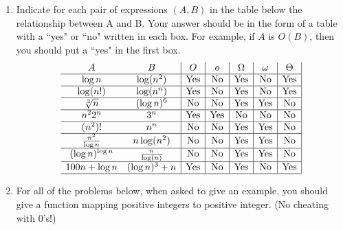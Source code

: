 \documentclass[12pt]{scrartcl}
\begin{document}
\begin{enumerate}
	\item Indicate for each pair of expressions $(A, B)$ in the table below the relationship between A and B. Your answer should be in the form of a table with a ``yes" or ``no" written in each box. For example, if $A$ is $O(B)$, then you should put a ``yes" in the first box.
$$
\begin{array}{cc|c|c|c|c|c|} 
		A 				& B 				& 	O 			& 	o			 & 	\Omega 	& 	\omega 	& 	\Theta 	\\ \hline 
	\log{n} 				& \log(n^2) 		& 	\text{Yes}	&	\text{No} 	& 	\text{Yes}	& 	\text{No}	& 	\text{Yes}		\\ \hline 
	\log (n!) 			& \log(n^n) 		& 	\text{Yes}	& 	\text{No}	& 	\text{Yes}	& 	\text{No}	& 	\text{Yes}		\\ \hline 
	\sqrt[3]{n} 			& (\log n)^{6} 		& 	\text{No}	& 	\text{No}	& 	\text{Yes}	& 	\text{Yes}	& 	\text{No}		\\ \hline 
	n^22^n 			& 3^n 				& 	\text{Yes}	& 	\text{Yes}	& 	\text{No}	& 	\text{No}	& 	\text{No}		\\ \hline 
	(n^2)! 				& n^n 				& 	\text{No}	& 	\text{No}	& 	\text{Yes}	& 	\text{Yes}	&	\text{No}		 \\ \hline 
	{n^2 \over \log{n}}	& n \log(n^2) 		& 	\text{No}	& 	\text{No}	& 	\text{Yes}	& 	\text{Yes}	& 	\text{No}		\\ \hline 
	(\log n)^{\log n} 	& {n \over \log(n)} 	& 	\text{No}	& 	\text{No}	& 	\text{Yes}	& 	\text{Yes}	& 	\text{No}		\\ \hline 
	100n + \log n 		& (\log n)^{3} + n 	& 	\text{Yes}	& 	\text{No}	& 	\text{Yes}	& 	\text{No}	& 	\text{Yes}		\\ \hline 
\end{array}
$$

	\item For all of the problems below, when asked to give an example, you should give a function mapping positive integers to positive integer. (No cheating with 0's!)
	

\end{enumerate}
\end{document}
